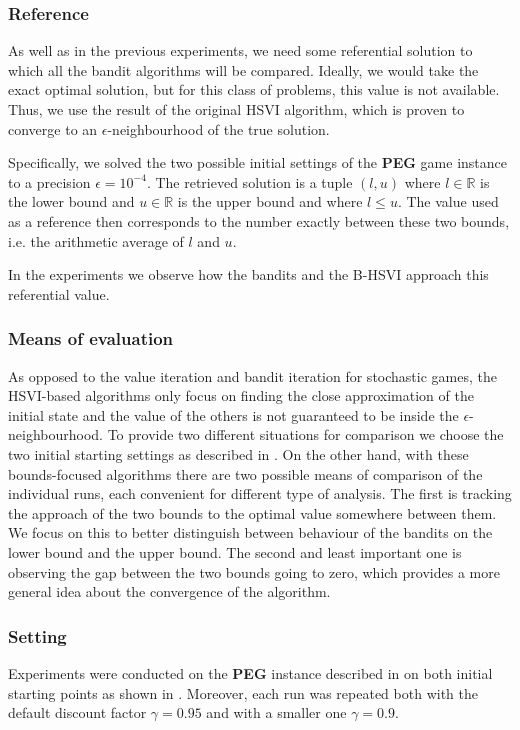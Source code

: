 \documentclass[../main.tex]{subfiles}
\begin{document}
\subsubsection{Reference}\label{exp:osposg:env:ref}
As well as in the previous experiments, we need some referential solution to which all the bandit algorithms will be compared.
Ideally, we would take the exact optimal solution, but for this class of problems, this value is not available.
Thus, we use the result of the original HSVI algorithm, which is proven to converge to an $\epsilon$-neighbourhood of the true solution.

Specifically, we solved the two possible initial settings of the \textbf{PEG} game instance  to a precision $\epsilon = 10^{-4}$.
The retrieved solution is a tuple $\left(l, u\right)$ where $l \in \mathbb{R}$ is the lower bound and $u \in \mathbb{R}$ is the upper bound and where $l \leq u$.
The value used as a reference then corresponds to the number exactly between these two bounds, i.e. the arithmetic average of $l$ and $u$.

In the experiments we observe how the bandits and the B-HSVI approach this referential value.

\subsubsection{Means of evaluation}\label{exp:osposg:env:eval}
As opposed to the value iteration and bandit iteration for stochastic games, the HSVI-based algorithms only focus on finding the close approximation of the initial state and the value of the others is not guaranteed to be inside the $\epsilon$-neighbourhood.
To provide two different situations for comparison we choose the two initial starting settings as described in .
On the other hand, with these bounds-focused algorithms there are two possible means of comparison of the individual runs, each convenient for different type of analysis.
The first is tracking the approach of the two bounds to the optimal value somewhere between them.
We focus on this to better distinguish between behaviour of the bandits on the lower bound and the upper bound.
The second and least important one is observing the gap between the two bounds going to zero, which provides a more general idea about the convergence of the algorithm.

\subsubsection{Setting}\label{exp:osposg:env:runs}
Experiments were conducted on the \textbf{PEG} instance described in  on both initial starting points as shown in .
Moreover, each run was repeated both with the default discount factor $\gamma = 0.95$ and with a smaller one $\gamma = 0.9$.
\end{document}
